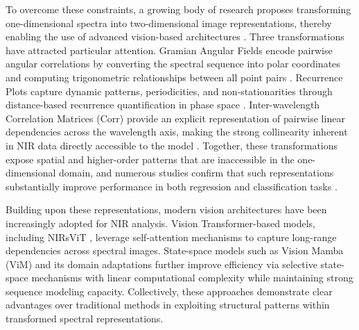 \documentclass[pdflatex,sn-mathphys-num]{sn-jnl}%
\begin{document}
To overcome these constraints, a growing body of research proposes transforming one-dimensional spectra into two-dimensional image representations, thereby enabling the use of advanced vision-based architectures \cite{jin2023innovative, deev2024spectrum}. Three transformations have attracted particular attention. Gramian Angular Fields encode pairwise angular correlations by converting the spectral sequence into polar coordinates and computing trigonometric relationships between all point pairs \cite{zhang2025near, jin2023innovative, li2024combined}. Recurrence Plots capture dynamic patterns, periodicities, and non-stationarities through distance-based recurrence quantification in phase space \cite{liu2025effective, deev2024spectrum}. Inter-wavelength Correlation Matrices (Corr) provide an explicit representation of pairwise linear dependencies across the wavelength axis, making the strong collinearity inherent in NIR data directly accessible to the model \cite{yan2022two, hosseinpour2023cnn}. Together, these transformations expose spatial and higher-order patterns that are inaccessible in the one-dimensional domain, and numerous studies confirm that such representations substantially improve performance in both regression and classification tasks \cite{zhao2024multiscale, li2024combined}.

Building upon these representations, modern vision architectures have been increasingly adopted for NIR analysis. Vision Transformer-based models, including NIRsViT \cite{van2024nirsvit}, leverage self-attention mechanisms to capture long-range dependencies across spectral images. State-space models such as Vision Mamba (ViM) \cite{zhu2024vision} and its domain adaptations \cite{liao2025specspatmamba} further improve efficiency via selective state-space mechanisms with linear computational complexity while maintaining strong sequence modeling capacity. Collectively, these approaches demonstrate clear advantages over traditional methods in exploiting structural patterns within transformed spectral representations.
\end{document}
